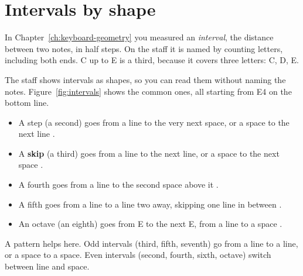 \section{Intervals by shape}

In Chapter~\ref{ch:keyboard-geometry} you measured an \emph{interval}, the distance between two notes, in half steps. On the staff it is named by counting letters, including both ends. C up to E is a third, because it covers three letters: C, D, E.

The staff shows intervals as shapes, so you can read them without naming the notes. Figure~\ref{fig:intervals} shows the common ones, all starting from E4 on the bottom line.
\begin{itemize}
  \item A step (a second) goes from a line to the very next space, or a space to the next line .
  \item A \textbf{skip} (a third) goes from a line to the next line, or a space to the next space .
  \item A fourth goes from a line to the second space above it .
  \item A fifth goes from a line to a line two away, skipping one line in between .
  \item An octave (an eighth) goes from E to the next E, from a line to a space .
\end{itemize}

A pattern helps here. Odd intervals (third, fifth, seventh) go from a line to a line, or a space to a space. Even intervals (second, fourth, sixth, octave) switch between line and space.


